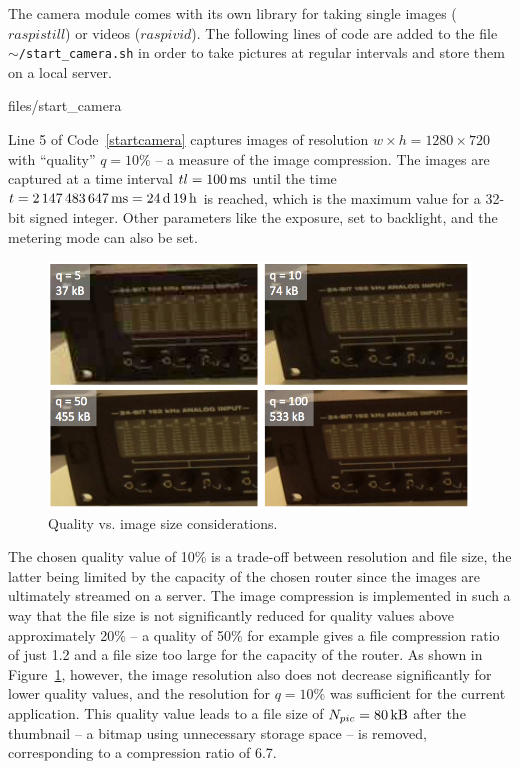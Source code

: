The camera module comes with its own library for taking single images ($raspistill$) or videos ($raspivid$).
The following lines of code are added to the file \texttt{$\sim$/start\_camera.sh} in order to take pictures at regular intervals and store them on a local server. 
\begin{center}
\begin{minipage}{0.9\linewidth}
\begin{lstinputlisting}[caption=\texttt{$\sim$/start\_camera.sh}., label=startcamera, frame=none]
    {files/start_camera}
\end{lstinputlisting}
\end{minipage}
\end{center}

Line 5 of Code~\ref{startcamera} captures images of resolution $w\times h = 1280 \times 720$ with ``quality'' $q=10\%$ -- a measure of the image compression. 
The images are captured at a time interval $tl = \SI{100}{ms}$ until the time $t = \SI{2147483647}{ms} = \SI{24}{d}\,\SI{19}{h}$ is reached, which is the maximum value for a 32-bit signed integer.
Other parameters like the exposure, set to backlight, and the metering mode can also be set. 

\begin{figure}
    \centering
    \includegraphics[width=.8\linewidth]{files/quality.png}
    \caption{Quality vs. image size considerations.}
    \label{fig:quality}
\end{figure}
The chosen quality value of 10\% is a trade-off between resolution and file size, the latter being limited by the capacity of the chosen router since the images are ultimately streamed on a server.
The image compression is implemented in such a way that the file size is not significantly reduced for quality values above approximately 20\% -- a quality of 50\% for example gives a file compression ratio of just 1.2 and a file size too large for the capacity of the router.
As shown in Figure~\ref{fig:quality}, however, the image resolution also does not decrease significantly for lower quality values, and the resolution for $q=10\%$ was sufficient for the current application. 
This quality value leads to a file size of $N_{pic} = \SI{80}{kB}$ after the thumbnail -- a bitmap using unnecessary storage space -- is removed, corresponding to a compression ratio of 6.7.


